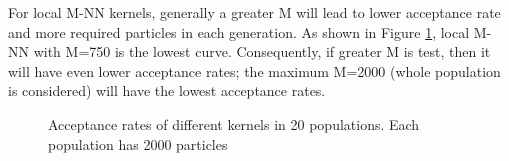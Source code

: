 \documentclass[12pt,a4paper]{report}
\begin{document}
For local M-NN kernels, generally a greater M will lead to lower acceptance rate and 
more required particles in each generation. As shown in Figure \ref{fig:acceptance1}, local M-NN with M=750 is the lowest curve. Consequently, if greater M is test, then it will have even lower acceptance rates; the maximum M=2000 (whole population is considered) will have the lowest acceptance rates.

\begin{figure}
    \begin{center}
    \end{center}
    
    \caption[Total required samples of different kernels]%
        {Total required samples of different kernels after 20 populations (2000 particles in each population). Different color represents different generations (bottom to top: population 1 to population 20)}
    \label{fig:kernel1}

    \vspace*{\floatsep}

    \begin{center}
    \end{center}
    
    \caption[Acceptance rates of different kernels]%
    {Acceptance rates of different kernels in 20 populations. Each population has 2000 particles}
    \label{fig:acceptance1}
    
\end{figure}
\end{document}
